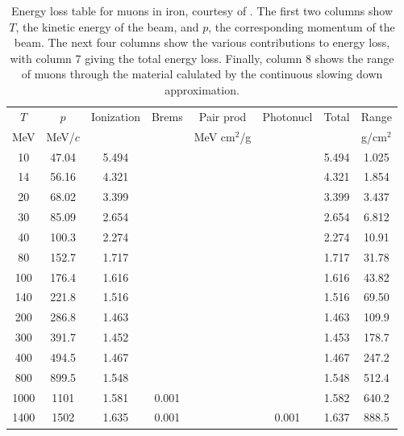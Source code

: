 \begin{table}
\caption[Energy loss table for muons in iron.]{Energy loss table for muons in iron, courtesy of \cite{PDGTables}. The first two columns show $T$, the kinetic energy of the beam, and $p$, the corresponding momentum of the beam. The next four columns show the various contributions to energy loss, with column 7 giving the total energy loss. Finally, column 8 shows the range of muons through the material calulated by the continuous slowing down approximation.}
\begin{tabularx}{\textwidth}{cccccccc}
\hline \hline
$T$ & $p$ & Ionization & Brems & Pair prod & Photonucl & Total & Range\vspace{-12pt}\\
MeV & MeV/$c$ & \multicolumn{2}{c}{\sout{\hspace{3cm}}} & MeV cm$^2$/g & \multicolumn{2}{c}{\sout{\hspace{3cm}}} & g/cm$^2$\\ \hline
10 & 47.04 & 5.494 & &&& 5.494 & 1.025\vspace{-12pt}\\
14 & 56.16 & 4.321 & & & & 4.321 & 1.854\vspace{-12pt}\\
20 & 68.02 & 3.399 &  &   &  			& 3.399 & 3.437 \vspace{-12pt}\\
30 & 85.09 & 2.654 &  &  &  			& 2.654 & 6.812 \vspace{-12pt}\\
40 & 100.3 & 2.274 &  &  &  			& 2.274 & 10.91 \vspace{-12pt}\\
80 & 152.7 & 1.717 &  &  &  			& 1.717 & 31.78 \vspace{-12pt}\\
100 & 176.4 & 1.616 & &   &  			& 1.616 & 43.82 \vspace{-12pt}\\
140 & 221.8 & 1.516 & &   &  			& 1.516 & 69.50 \vspace{-12pt}\\
200 & 286.8 & 1.463 & &   &  			& 1.463 & 109.9 \vspace{-12pt}\\
300 & 391.7 & 1.452 & &   &  			& 1.453 & 178.7 \vspace{-12pt}\\
400 & 494.5 & 1.467 & &   &  			& 1.467 & 247.2 \vspace{-12pt}\\
800 & 899.5 & 1.548 & &   &  			& 1.548 & 512.4 \vspace{-12pt}\\
1000 & 1101 & 1.581  & 0.001 & &  		& 1.582 & 640.2 \vspace{-12pt}\\
1400 & 1502 & 1.635  & 0.001 & & 0.001 	& 1.637 & 888.5\\
\hline
\end{tabularx}
\label{tbl:elossfe}
\end{table}

